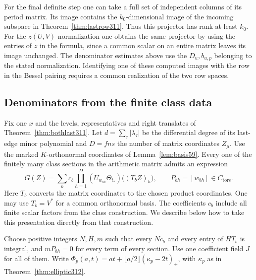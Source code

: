 \documentclass[a4paper,11pt]{article}
\theoremstyle{definition}
\theoremstyle{remark}
\numberwithin{equation}{section}
\begin{document}
For the final definite step one can take a full set of
independent columns of its period matrix. Its image contains
the \(k_0\)-dimensional image of the incoming subspace in
Theorem~\ref{thm:lastrow311}. Thus this projector has rank at
least \(k_0\). For the \(z(U,V)\) normalization one obtains
the same projector by using the entries of \(z\) in the
formula, since a common scalar on an entire matrix leaves
its image unchanged. The denominator estimates above use
the \(D_u,b_{u,p}\) belonging to the stated normalization.
Identifying one of these computed images with the row in
the Bessel pairing requires a common realization of the two
row spaces.

\subsection{Denominators from the finite class data}\label{nav:VIII-61}
Fix one \(x\) and the levels, representatives and right translates
of Theorem~\ref{thm:bothlast311}. Let \(d=\sum_\tau|\lambda_\tau|\)
be the differential degree of its last-edge minor polynomial and
\(D=fns\) the number of matrix coordinates \(Z_\mu\).
Use the marked \(K\)-orthonormal coordinates of
Lemma~\ref{lem:basis59}. Every one of the finitely many class sections
in the arithmetic matrix admits an expression
\[
 G(Z)=\sum_b c_b\prod_{h=1}^D
       (U_{w_{bh}}\Theta_{t_*})\big((T_bZ)_h\big),
       \qquad P_{bh}=[w_{bh}]\in C_{\mathrm{tors}} .
\]
Here \(T_b\) converts the matrix coordinates to the chosen product
coordinates. One may use \(T_b=V^*\) for a common orthonormal basis.
The coefficients \(c_b\) include all finite scalar factors from the
class construction. We describe below how to take this presentation
directly from that construction.

Choose positive integers \(N,H,m\) such that every \(Nc_b\) and
every entry of \(HT_b\) is integral, and \(mP_{bh}=0\) for every
term of every section. Use one coefficient field \(J\) for all of
them. Write \(\Phi_p(a,t)=at+\lfloor a/2\rfloor(\kappa_p-2t)_+\),
with \(\kappa_p\) as in Theorem~\ref{thm:elliptic312}.
\end{document}
